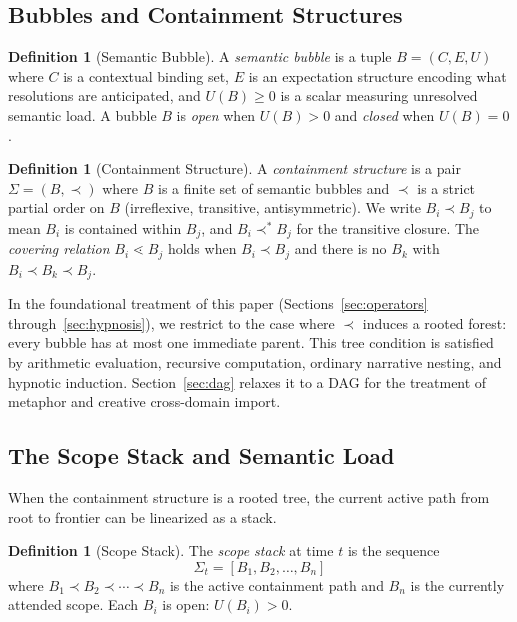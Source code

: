 \documentclass[12pt, a4paper]{article}
\theoremstyle{plain}
\theoremstyle{definition}
\newtheorem{definition}[theorem]{Definition}
\theoremstyle{remark}
\begin{document}
\subsection{Bubbles and Containment Structures}

\begin{definition}[Semantic Bubble]
A \emph{semantic bubble} is a tuple $B = (C, E, U)$ where $C$ is a
contextual binding set, $E$ is an expectation structure encoding what
resolutions are anticipated, and $U(B) \geq 0$ is a scalar measuring
unresolved semantic load. A bubble $B$ is \emph{open} when $U(B) > 0$ and
\emph{closed} when $U(B) = 0$.
\end{definition}

\begin{definition}[Containment Structure]
A \emph{containment structure} is a pair $\Sigma = (B, \prec)$ where $B$ is
a finite set of semantic bubbles and $\prec$ is a strict partial order on $B$
(irreflexive, transitive, antisymmetric). We write $B_i \prec B_j$ to mean
$B_i$ is contained within $B_j$, and $B_i \prec^* B_j$ for the transitive
closure. The \emph{covering relation} $B_i \lessdot B_j$ holds when $B_i
\prec B_j$ and there is no $B_k$ with $B_i \prec B_k \prec B_j$.
\end{definition}

In the foundational treatment of this paper (Sections~\ref{sec:operators}
through~\ref{sec:hypnosis}), we restrict to the case where $\prec$ induces a
rooted forest: every bubble has at most one immediate parent. This tree
condition is satisfied by arithmetic evaluation, recursive computation,
ordinary narrative nesting, and hypnotic induction. Section~\ref{sec:dag}
relaxes it to a DAG for the treatment of metaphor and creative
cross-domain import.

\subsection{The Scope Stack and Semantic Load}

When the containment structure is a rooted tree, the current active path from
root to frontier can be linearized as a stack.

\begin{definition}[Scope Stack]
The \emph{scope stack} at time $t$ is the sequence
\[
  \Sigma_t = [B_1, B_2, \ldots, B_n]
\]
where $B_1 \prec B_2 \prec \cdots \prec B_n$ is the active containment path
and $B_n$ is the currently attended scope. Each $B_i$ is open: $U(B_i) > 0$.
\end{definition}
\end{document}
